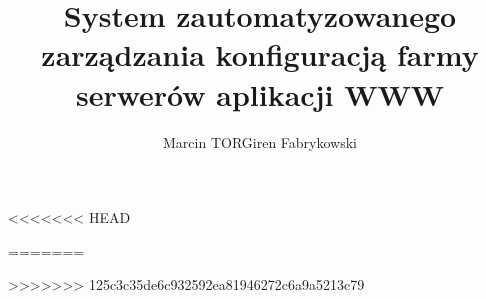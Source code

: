 \documentclass[a4paper,12pt,oneside]{book}
\title{System zautomatyzowanego zarządzania konfiguracją farmy serwerów aplikacji WWW}
\author{Marcin TORGiren Fabrykowski}
\begin{document}
\nocite{*}
%






<<<<<<< HEAD

=======

>>>>>>> 125c3c35de6c932592ea81946272c6a9a5213c79

\newpage
{}
\listoffigures 
\end{document}
